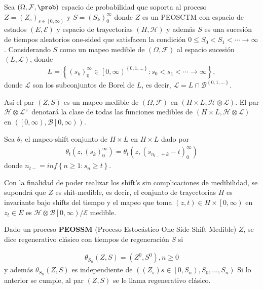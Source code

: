 \begin{Def}
Sea $\left(\Omega,\mathcal{F},\prob\right)$ espacio de probabilidad que soporta al proceso $Z=\left(Z_{s}\right)_{s\in\left[0,\infty\right)}$ y $S=\left(S_{k}\right)_{0}^{\infty}$ donde $Z$ es un PEOSCTM con espacio de estados $\left(E,\mathcal{E}\right)$  y espacio de trayectorias $\left(H,\mathcal{H}\right)$  y adem\'as $S$ es una sucesi\'on de tiempos aleatorios one-sided que satisfacen la condici\'on $0\leq S_{0}<S_{1}<\cdots\rightarrow\infty$. Considerando $S$ como un mapeo medible de $\left(\Omega,\mathcal{F}\right)$ al espacio sucesi\'on $\left(L,\mathcal{L}\right)$, donde 
\begin{eqnarray*}
L=\left\{\left(s_{k}\right)_{0}^{\infty}\in\left[0,\infty\right)^{\left\{0,1,\ldots\right\}}:s_{0}<s_{1}<\cdots\rightarrow\infty\right\},
\end{eqnarray*}
donde $\mathcal{L}$ son los subconjuntos de Borel de $L$, es decir, $\mathcal{L}=L\cap\mathcal{B}^{\left\{0,1,\ldots\right\}}$.

As\'i el par $\left(Z,S\right)$ es un mapeo medible de  $\left(\Omega,\mathcal{F}\right)$ en $\left(H\times L,\mathcal{H}\otimes\mathcal{L}\right)$. El par $\mathcal{H}\otimes\mathcal{L}^{+}$ denotar\'a la clase de todas las funciones medibles de $\left(H\times L,\mathcal{H}\otimes\mathcal{L}\right)$ en $\left(\left[0,\infty\right),\mathcal{B}\left[0,\infty\right)\right)$.
\end{Def}


\begin{Def}
Sea $\theta_{t}$ el mapeo-shift conjunto de $H\times L$ en $H\times L$ dado por
\begin{eqnarray*}
\theta_{t}\left(z,\left(s_{k}\right)_{0}^{\infty}\right)=\theta_{t}\left(z,\left(s_{n_{t-}+k}-t\right)_{0}^{\infty}\right)
\end{eqnarray*}
donde 
$n_{t-}=inf\left\{n\geq1:s_{n}\geq t\right\}$.
\end{Def}

Con la finalidad de poder realizar los shift's sin complicaciones de medibilidad, se supondr\'a que $Z$ es shit-medible, es decir, el conjunto de trayectorias $H$ es invariante bajo shifts del tiempo y el mapeo que toma $\left(z,t\right)\in H\times\left[0,\infty\right)$ en $z_{t}\in E$ es $\mathcal{H}\otimes\mathcal{B}\left[0,\infty\right)/\mathcal{E}$ medible.

\begin{Def}
Dado un proceso \textbf{PEOSSM} (Proceso Estoc\'astico One Side Shift Medible) $Z$, se dice regenerativo cl\'asico con tiempos de regeneraci\'on $S$ si 

\begin{eqnarray*}
\theta_{S_{n}}\left(Z,S\right)=\left(Z^{0},S^{0}\right),n\geq0
\end{eqnarray*}
y adem\'as $\theta_{S_{n}}\left(Z,S\right)$ es independiente de $\left(\left(Z_{s}\right)s\in\left[0,S_{n}\right),S_{0},\ldots,S_{n}\right)$
Si lo anterior se cumple, al par $\left(Z,S\right)$ se le llama regenerativo cl\'asico.
\end{Def}

